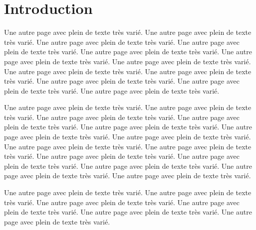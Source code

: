 \chapter*{Introduction}

    \label{INTRODUCTION}

    Une autre page avec plein de texte très varié.
    Une autre page avec plein de texte très varié.
    Une autre page avec plein de texte très varié.
    Une autre page avec plein de texte très varié.
    Une autre page avec plein de texte très varié.
    Une autre page avec plein de texte très varié.
    Une autre page avec plein de texte très varié.
    Une autre page avec plein de texte très varié.
    Une autre page avec plein de texte très varié.
    Une autre page avec plein de texte très varié.
    Une autre page avec plein de texte très varié.
    Une autre page avec plein de texte très varié.

    Une autre page avec plein de texte très varié.
    Une autre page avec plein de texte très varié.
    Une autre page avec plein de texte très varié.
    Une autre page avec plein de texte très varié.
    Une autre page avec plein de texte très varié.
    Une autre page avec plein de texte très varié.
    Une autre page avec plein de texte très varié.
    Une autre page avec plein de texte très varié.
    Une autre page avec plein de texte très varié.
    Une autre page avec plein de texte très varié.
    Une autre page avec plein de texte très varié.
    Une autre page avec plein de texte très varié.
    Une autre page avec plein de texte très varié.
    Une autre page avec plein de texte très varié.


    Une autre page avec plein de texte très varié.
    Une autre page avec plein de texte très varié.
    Une autre page avec plein de texte très varié.
    Une autre page avec plein de texte très varié.
    Une autre page avec plein de texte très varié.
    Une autre page avec plein de texte très varié.